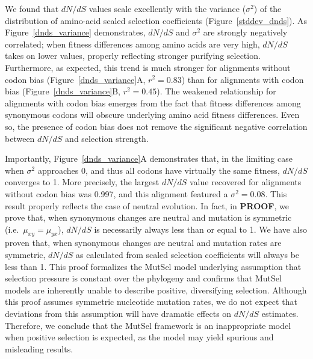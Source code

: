 \documentclass{pnastwo}
\begin{document}
\begin{article}
We found that $dN/dS$ values scale excellently with the variance ($\sigma^2$) of the distribution of amino-acid scaled selection coefficients (Figure~\ref{stddev_dnds}). As Figure~\ref{dnds_variance} demonstrates, $dN/dS$ and $\sigma^2$ are strongly negatively correlated; when fitness differences among amino acids are very high, $dN/dS$ takes on lower values, properly reflecting stronger purifying selection. Furthermore, as expected, this trend is much stronger for alignments without codon bias (Figure~\ref{dnds_variance}A, $r^2 = 0.83$) than for alignments with codon bias (Figure~\ref{dnds_variance}B, $r^2 = 0.45$). The weakened relationship for alignments with codon bias emerges from the fact that fitness differences among synonymous codons will obscure underlying amino acid fitness differences. Even so, the presence of codon bias does not remove the significant negative correlation between $dN/dS$ and selection strength.
		
Importantly, Figure~\ref{dnds_variance}A demonstrates that, in the limiting case when $\sigma^2$ approaches 0, and thus all codons have virtually the same fitness, $dN/dS$ converges to 1. More precisely, the largest $dN/dS$ value recovered for alignments without codon bias was 0.997, and this alignment featured a $\sigma^2 = 0.08$. This result properly reflects the case of neutral evolution. In fact, in \textbf{PROOF}, we prove that, when synonymous changes are neutral and mutation is symmetric (i.e.\ $\mu_{xy} = \mu_{yx}$), $dN/dS$ is necessarily always less than or equal to 1. We have also proven that, when synonymous changes are neutral and mutation rates are symmetric, $dN/dS$ as calculated from scaled selection coefficients will always be less than 1. This proof formalizes the MutSel model underlying assumption that selection pressure is constant over the phylogeny and confirms that MutSel models are inherently unable to describe positive, diversifying selection. Although this proof assumes symmetric nucleotide mutation rates, we do not expect that deviations from this assumption will have dramatic effects on $dN/dS$ estimates. Therefore, we conclude that the MutSel framework is an inappropriate model when positive selection is expected, as the model may yield spurious and misleading results. 


\end{article}
\end{document}
